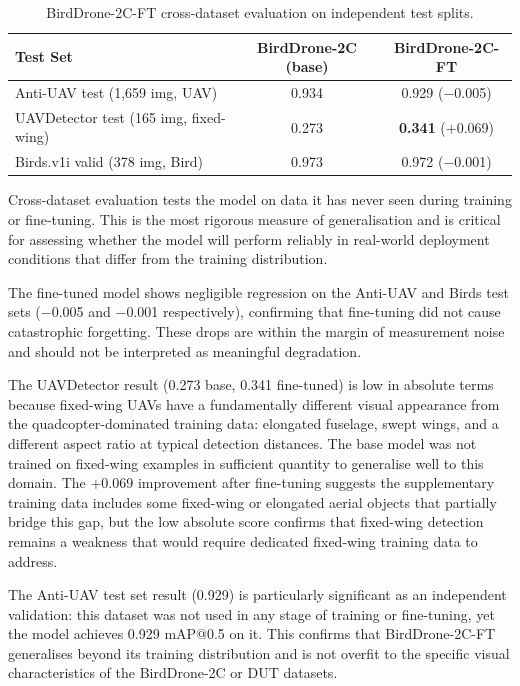 \documentclass[12pt,a4paper]{report}
\begin{document}
\begin{table}[H]
\centering
\caption{BirdDrone-2C-FT cross-dataset evaluation on independent test splits.}
\label{tab:cross}
\begin{tabular}{|l|c|c|}
\hline
\textbf{Test Set} & \textbf{BirdDrone-2C (base)} & \textbf{BirdDrone-2C-FT} \\
\hline
Anti-UAV test (1,659 img, UAV)         & 0.934 & 0.929 ($-$0.005) \\
\hline
UAVDetector test (165 img, fixed-wing) & 0.273 & \textbf{0.341} ($+$0.069) \\
\hline
Birds.v1i valid (378 img, Bird)        & 0.973 & 0.972 ($-$0.001) \\
\hline
\end{tabular}
\end{table}

Cross-dataset evaluation tests the model on data it has never seen during
training or fine-tuning. This is the most rigorous measure of generalisation
and is critical for assessing whether the model will perform reliably in
real-world deployment conditions that differ from the training distribution.

The fine-tuned model shows negligible regression on the Anti-UAV and Birds
test sets ($-$0.005 and $-$0.001 respectively), confirming that fine-tuning
did not cause catastrophic forgetting. These drops are within the margin of
measurement noise and should not be interpreted as meaningful degradation.

The UAVDetector result (0.273 base, 0.341 fine-tuned) is low in absolute terms
because fixed-wing UAVs have a fundamentally different visual appearance from the
quadcopter-dominated training data: elongated fuselage, swept wings, and a
different aspect ratio at typical detection distances. The base model was not
trained on fixed-wing examples in sufficient quantity to generalise well to this
domain. The +0.069 improvement after fine-tuning suggests the supplementary
training data includes some fixed-wing or elongated aerial objects that partially
bridge this gap, but the low absolute score confirms that fixed-wing detection
remains a weakness that would require dedicated fixed-wing training data to address.

The Anti-UAV test set result (0.929) is particularly significant as an
independent validation: this dataset was not used in any stage of training
or fine-tuning, yet the model achieves 0.929 mAP@0.5 on it. This confirms
that BirdDrone-2C-FT generalises beyond its training distribution and is
not overfit to the specific visual characteristics of the BirdDrone-2C
or DUT datasets.
\end{document}
